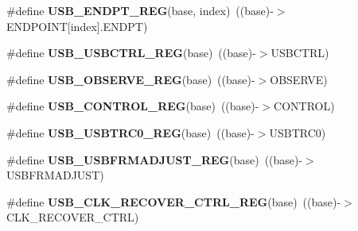 \begin{DoxyCompactItemize}
\item 
\#define {\bfseries U\+S\+B\+\_\+\+E\+N\+D\+P\+T\+\_\+\+R\+EG}(base,  index)~((base)-\/$>$E\+N\+D\+P\+O\+I\+NT\mbox{[}index\mbox{]}.E\+N\+D\+PT)\hypertarget{group__USB__Register__Accessor__Macros_ga93e8b132ffc209ad3ba99ba2cbf4f990}{}\label{group__USB__Register__Accessor__Macros_ga93e8b132ffc209ad3ba99ba2cbf4f990}

\item 
\#define {\bfseries U\+S\+B\+\_\+\+U\+S\+B\+C\+T\+R\+L\+\_\+\+R\+EG}(base)~((base)-\/$>$U\+S\+B\+C\+T\+RL)\hypertarget{group__USB__Register__Accessor__Macros_ga7e767cbc19006f290fd3acb0bda4b0d7}{}\label{group__USB__Register__Accessor__Macros_ga7e767cbc19006f290fd3acb0bda4b0d7}

\item 
\#define {\bfseries U\+S\+B\+\_\+\+O\+B\+S\+E\+R\+V\+E\+\_\+\+R\+EG}(base)~((base)-\/$>$O\+B\+S\+E\+R\+VE)\hypertarget{group__USB__Register__Accessor__Macros_gacf3b928d262722e221b19407d6fd1d4b}{}\label{group__USB__Register__Accessor__Macros_gacf3b928d262722e221b19407d6fd1d4b}

\item 
\#define {\bfseries U\+S\+B\+\_\+\+C\+O\+N\+T\+R\+O\+L\+\_\+\+R\+EG}(base)~((base)-\/$>$C\+O\+N\+T\+R\+OL)\hypertarget{group__USB__Register__Accessor__Macros_gae70ee8839acefd0aeb3e0c5129b59c76}{}\label{group__USB__Register__Accessor__Macros_gae70ee8839acefd0aeb3e0c5129b59c76}

\item 
\#define {\bfseries U\+S\+B\+\_\+\+U\+S\+B\+T\+R\+C0\+\_\+\+R\+EG}(base)~((base)-\/$>$U\+S\+B\+T\+R\+C0)\hypertarget{group__USB__Register__Accessor__Macros_gaff7c1525f5741bfe869a137149371c89}{}\label{group__USB__Register__Accessor__Macros_gaff7c1525f5741bfe869a137149371c89}

\item 
\#define {\bfseries U\+S\+B\+\_\+\+U\+S\+B\+F\+R\+M\+A\+D\+J\+U\+S\+T\+\_\+\+R\+EG}(base)~((base)-\/$>$U\+S\+B\+F\+R\+M\+A\+D\+J\+U\+ST)\hypertarget{group__USB__Register__Accessor__Macros_ga0c14a322173f3a4dbb3cc4ea025724ae}{}\label{group__USB__Register__Accessor__Macros_ga0c14a322173f3a4dbb3cc4ea025724ae}

\item 
\#define {\bfseries U\+S\+B\+\_\+\+C\+L\+K\+\_\+\+R\+E\+C\+O\+V\+E\+R\+\_\+\+C\+T\+R\+L\+\_\+\+R\+EG}(base)~((base)-\/$>$C\+L\+K\+\_\+\+R\+E\+C\+O\+V\+E\+R\+\_\+\+C\+T\+RL)\hypertarget{group__USB__Register__Accessor__Macros_ga818bf18092232d19064e35d6af609867}{}\label{group__USB__Register__Accessor__Macros_ga818bf18092232d19064e35d6af609867}


\end{DoxyCompactItemize}
